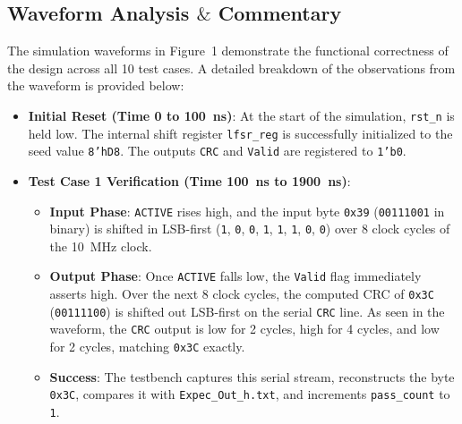 \documentclass[11pt]{article}
\begin{document}
\subsection{Waveform Analysis $\&$ Commentary}
The simulation waveforms in Figure~1 demonstrate the functional correctness of the design across all 10 test cases. A detailed breakdown of the observations from the waveform is provided below:

\begin{itemize}
    \item \textbf{Initial Reset (Time 0 to 100~ns)}:
    At the start of the simulation, \texttt{rst\_n} is held low. The internal shift register \texttt{lfsr\_reg} is successfully initialized to the seed value \texttt{8'hD8}. The outputs \texttt{CRC} and \texttt{Valid} are registered to \texttt{1'b0}.

    \item \textbf{Test Case 1 Verification (Time 100~ns to 1900~ns)}:
    \begin{itemize}
        \item \textbf{Input Phase}: \texttt{ACTIVE} rises high, and the input byte \texttt{0x39} (\texttt{00111001} in binary) is shifted in LSB-first (\texttt{1}, \texttt{0}, \texttt{0}, \texttt{1}, \texttt{1}, \texttt{1}, \texttt{0}, \texttt{0}) over 8 clock cycles of the 10~MHz clock.
        \item \textbf{Output Phase}: Once \texttt{ACTIVE} falls low, the \texttt{Valid} flag immediately asserts high. Over the next 8 clock cycles, the computed CRC of \texttt{0x3C} (\texttt{00111100}) is shifted out LSB-first on the serial \texttt{CRC} line. As seen in the waveform, the \texttt{CRC} output is low for 2 cycles, high for 4 cycles, and low for 2 cycles, matching \texttt{0x3C} exactly.
        \item \textbf{Success}: The testbench captures this serial stream, reconstructs the byte \texttt{0x3C}, compares it with \texttt{Expec\_Out\_h.txt}, and increments \texttt{pass\_count} to \texttt{1}.
    \end{itemize}


\end{itemize}
\end{document}
